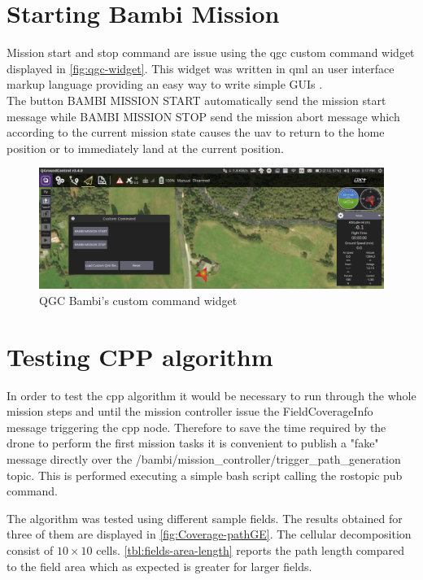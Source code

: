 \section{Starting Bambi Mission} %
\label{sec:starting_bambi_mission}
Mission start and stop command are issue using the \acrshort{qgc} custom command widget displayed in \autoref{fig:qgc-widget}. This widget was written in \acrfull{qml} an user interface markup language providing an easy way to write simple GUIs \cite{QML}.\\
The button \textsf{BAMBI MISSION START} automatically send the mission start message while \textsf{BAMBI MISSION STOP} send the mission abort message which according to the current mission state causes the \acrshort{uav} to return to the home position or to immediately land at the current position.
\begin{figure}[ht]
  \centering
  \includegraphics[width=.9\linewidth]{figures/C4/simulation/qgc-widget.png}
  \caption{QGC Bambi's custom command widget}
  \label{fig:qgc-widget}
\end{figure}

\section{Testing CPP algorithm} %
\label{sec:testing_cpp_algorithm}
In order to test the \acrlong{cpp} algorithm it would be necessary to run through the whole mission steps and until the mission controller issue the \textsf{FieldCoverageInfo} message triggering the \acrshort{cpp} node. Therefore to save the time required by the drone to perform the first mission tasks it is convenient to publish a "fake" message directly over the \textsf{/bambi/mission\_controller/trigger\_path\_generation} topic. This is performed executing a simple bash script calling the \textsf{rostopic pub} command.\par
The algorithm was tested using different sample fields. The results obtained for three of them are displayed in \autoref{fig:Coverage-pathGE}. The cellular decomposition consist of $10 \times 10$ cells. \autoref{tbl:fields-area-length} reports the path length compared to the field area which as expected is greater for larger fields.

